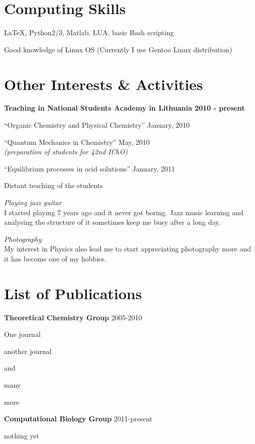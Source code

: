 \section{Computing Skills}
\begin{loneinnerlist}
  \item \LaTeX, Python2/3, Matlab, LUA, basic Bash scripting
  \item Good knowledge of Linux OS (Currently I use Gentoo Linux distribution)
\end{loneinnerlist}

\section{Other Interests \& Activities}

\textbf{Teaching in National Students Academy in Lithuania
\hfill 2010 - present}
\begin{innerlist}
  \item ``Organic Chemistry and Physical Chemistry''
    \hfill January, 2010 
  \item ``Quantum Mechanics in Chemistry'' 
    \hfill May, 2010 \\
    {\em (preparation of students for 42nd IChO)}
  \item ``Equilibrium processes in acid solutions''
    \hfill January, 2011
  \item Distant teaching of the students
\end{innerlist}
\begin{outerlist}
  \item[] \emph{Playing jazz guitar}\\
    I started playing 7 years ago and it never got boring. Jazz music learning
    and analysing the structure of it sometimes keep me busy after a long day.
  \item[] \emph{Photography}\\
    My interest in Physics also lead me to start appreciating
    photography more and it has become one of my hobbies.
\end{outerlist}

\section{List of Publications}
\textbf{Theoretical Chemistry Group}
\hfill{2005-2010}
\begin{innerlist}
    \item One journal
    \item another journal
    \item and
    \item many
    \item more
\end{innerlist}

\textbf{Computational Biology Group}
\hfill{2011-present}
\begin{innerlist}
    \item nothing yet
\end{innerlist}



